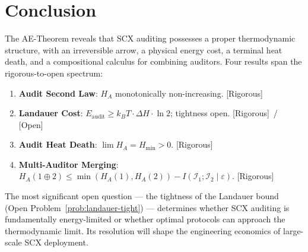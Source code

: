 \documentclass[12pt,a4paper]{article}
\newcommand{\rigorous}{\textcolor{green!50!black}{\small\textsf{[Rigorous]}}}
\newcommand{\openquest}{\textcolor{red!70!black}{\small\textsf{[Open]}}}
\newcommand{\cI}{\mathcal{I}}
\begin{document}
\section{Conclusion}

The AE-Theorem reveals that SCX auditing possesses a proper thermodynamic
structure, with an irreversible arrow, a physical energy cost, a terminal
heat death, and a compositional calculus for combining auditors.  Four results
span the rigorous-to-open spectrum:

\begin{enumerate}[label=(\arabic*)]
    \item \textbf{Audit Second Law}: $H_A$ monotonically non-increasing.  \rigorous
    \item \textbf{Landauer Cost}: $E_{\mathrm{audit}}\geq k_B T\cdot\Delta H\cdot\ln2$;
          tightness open.  \rigorous~/ \openquest
    \item \textbf{Audit Heat Death}: $\lim H_A = H_{\min} > 0$.  \rigorous
    \item \textbf{Multi-Auditor Merging}: $H_A(1\oplus2)\leq\min(H_A(1),H_A(2))-I(\cI_1;\cI_2\mid\varepsilon)$.
          \rigorous
\end{enumerate}

The most significant open question — the tightness of the Landauer bound
(Open Problem~\ref{prob:landauer-tight}) — determines whether SCX auditing is
fundamentally energy-limited or whether optimal protocols can approach the
thermodynamic limit.  Its resolution will shape the engineering economics of
large-scale SCX deployment.
\end{document}
